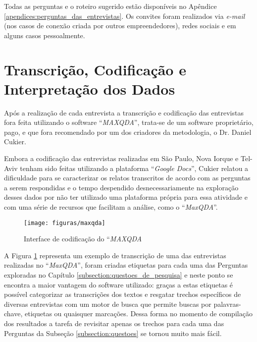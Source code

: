 Todas as perguntas e o roteiro sugerido estão disponíveis no Apêndice \ref{apendices:perguntas_das_entrevistas}. Os convites foram realizados via \textit{e-mail} (nos casos de conexão criada por outros empreendedores), redes sociais e em alguns casos pessoalmente. 

\section{Transcrição, Codificação e Interpretação dos Dados}
\label{subsection:codificacao_e_interpretacao_dos_dados}

Após a realização de cada entrevista a transcrição e codificação das entrevistas fora feita utilizando o software ``\textit{MAXQDA}'', trata-se de um software proprietário, pago, e que fora recomendado por um dos criadores da metodologia, o Dr. Daniel Cukier. 

Embora a codificação das entrevistas realizadas em São Paulo, Nova Iorque e Tel-Aviv tenham sido feitas utilizando a plataforma ``\textit{Google Docs}'', Cukier relatou a dificuldade para se caracterizar os relatos transcritos de acordo com as perguntas a serem respondidas e o tempo despendido desnecessariamente na exploração desses dados por não ter utilizado uma plataforma própria para essa atividade e com uma série de recursos que facilitam a análise, como o ``\textit{MaxQDA}''.

\begin{figure}[!htb]
	\centering
	\texttt{[image: figuras/maxqda]}
	\caption{Interface de codificação do ``\textit{MAXQDA}}
	\label{figure:maxqda}
\end{figure}

A Figura \ref{figure:maxqda} representa um exemplo de transcrição de uma das entrevistas realizadas no ``\textit{MaxQDA}'', foram criadas etiquetas para cada uma das Perguntas exploradas no Capítulo \ref{subsection:questoes_de_pesquisa} e neste ponto se encontra a maior vantagem do software utilizado: graças a estas etiquetas é possível categorizar as transcrições dos textos e resgatar trechos específicos de diversas entrevistas com um motor de busca que permite buscas por palavras-chave, etiquetas ou quaisquer marcações. Dessa forma no momento de compilação dos resultados a tarefa de revisitar apenas os trechos para cada uma das Perguntas da Subseção \ref{subsection:questoes} se tornou muito mais fácil.
